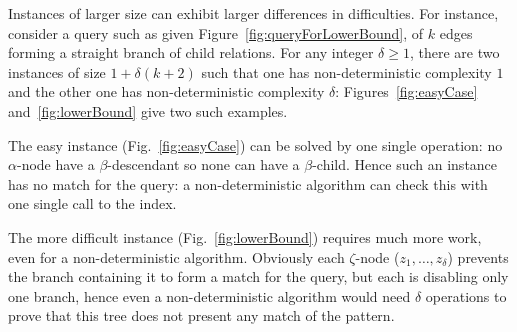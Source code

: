 Instances of larger size can exhibit larger differences in
difficulties.
%
For instance, consider a query such as given
Figure~\ref{fig:queryForLowerBound}, of $k$ edges forming a straight
branch of child relations.
%
For any integer $\delta\geq1$, there are two instances of size
$1+\delta(k+2)$ such that one has non-deterministic complexity $1$ and
the other one has non-deterministic complexity $\delta$:
Figures~\ref{fig:easyCase} and~\ref{fig:lowerBound} give two such
examples.

The easy instance (Fig.~\ref{fig:easyCase}) can be solved by one
single operation: no $\alpha$-node have a $\beta$-descendant so none
can have a $\beta$-child. Hence such an instance has no match for the
query: a non-deterministic algorithm can check this with one single
call to the index.

The more difficult instance (Fig.~\ref{fig:lowerBound}) requires much
more work, even for a non-deterministic algorithm. Obviously each
$\zeta$-node ($z_1,\ldots,z_\delta$) prevents the branch containing it
to form a match for the query, but each is disabling only one branch,
hence even a non-deterministic algorithm would need $\delta$
operations to prove that this tree does not present any match of the
pattern.

